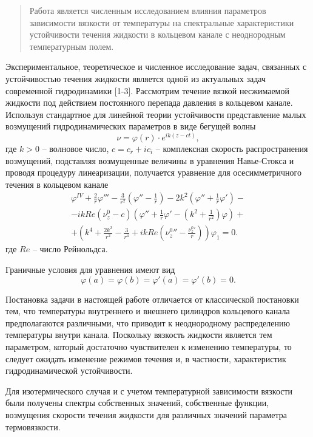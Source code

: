 \begin{abstract}
Работа является численным исследованием влияния параметров зависимости вязкости от температуры на спектральные характеристики устойчивости течения жидкости в кольцевом канале с неоднородным температурным полем.

\end{abstract}

Экспериментальное, теоретическое и численное исследование задач, связанных с устойчивостью течения жидкости является одной из актуальных задач современной гидродинамики [1-3].
Рассмотрим течение вязкой несжимаемой жидкости под действием постоянного перепада давления в кольцевом канале.
Используя стандартное для линейной теории устойчивости представление малых возмущений гидродинамических параметров в виде бегущей волны
$$
\nu=\varphi(r)\cdot e^{ik(z-ct)},
$$
где $k>0$ – волновое число, $c =c_r + ic_i$ – комплексная скорость распространения возмущений, подставляя возмущенные величины в уравнения Навье-Стокса и проводя процедуру линеаризации, получается уравнение для осесимметричного течения в кольцевом канале
$$
\begin{array}{l}
\varphi^{IV}+\frac{2}{r}\varphi'''-\frac{3}{r^2}\left(\varphi''-\frac{1}{r}\right)-2k^2\left(\varphi''+\frac{1}{r}\varphi'\right)-\\[1em]
-ikRe\left(\nu_z^0-c\right)\left(\varphi''+\frac{1}{r}\varphi'-\left(k^2+\frac{1}{r^2}\right)\varphi\right)+\\[1em]
+\left(k^4+\frac{2k^2}{r^2}-\frac{3}{r^4}+ikRe\left(\nu_z^0{''}-\frac{\nu_z^0{'}}{r}\right)\right)\varphi_1=0.
\end{array}
$$
где $Re$ – число Рейнольдса.

Граничные условия для уравнения имеют вид
$$
\varphi(a)=\varphi(b)=\varphi'(a)=\varphi'(b)=0.
$$

Постановка задачи в настоящей работе отличается от классической постановки тем, что температуры внутреннего и внешнего цилиндров кольцевого канала предполагаются различными, что приводит к неоднородному распределению температуры внутри канала. Поскольку вязкость жидкости является тем параметром, который достаточно чувствителен к изменению температуры, то следует ожидать изменение режимов течения и, в частности, характеристик гидродинамической устойчивости.

Для изотермического случая и с учетом температурной зависимости вязкости были получены спектры собственных значений, собственные функции, возмущения скорости течения жидкости для различных значений параметра термовязкости.

